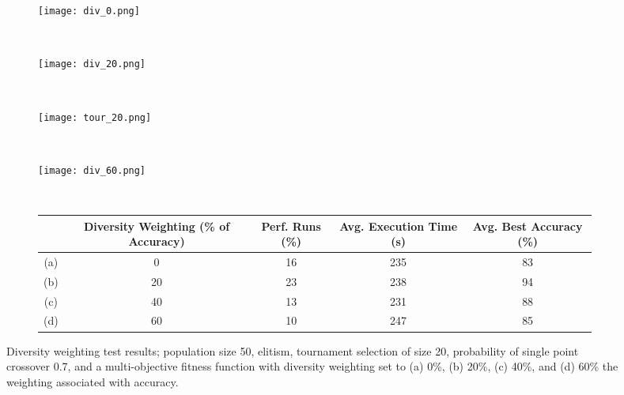 \begin{figure}
	\centering
	\begin{subfigure}[ht]{0.49\textwidth}
		\texttt{[image: div\_0.png]}
		\caption{}
		\label{fig:div_0}
		\vspace{1em}
	\end{subfigure}
	~
	\begin{subfigure}[ht]{0.49\textwidth}
		\texttt{[image: div\_20.png]}
		\caption{}
		\vspace{1em}
		\label{fig:div_2}
	\end{subfigure}
	~
	\begin{subfigure}[ht]{0.49\textwidth}
		\texttt{[image: tour\_20.png]}
		\caption{}
		\vspace{1em}
	\end{subfigure}
	~
	\begin{subfigure}[ht]{0.49\textwidth}
		\texttt{[image: div\_60.png]}
		\caption{}
		\vspace{1em}
		\label{fig:div_6}
	\end{subfigure}
	~
	\begin{subfigure}[ht]{\textwidth}
		\centering
		\begin{tabular}{ccccc}
			\toprule
			& \parbox{0.2\linewidth}{\centering \bfseries{Diversity Weighting (\% of Accuracy)}} &
			\bfseries{Perf. Runs (\%)} &
			\bfseries{Avg. Execution Time (s)} & \bfseries{Avg. Best Accuracy (\%)}\\
			\midrule
			(a) & 0 & 16 & 235 & 83\\
			(b) & 20 & 23 & 238 & 94\\
			(c) & 40 & 13 & 231 & 88\\
			(d) & 60 & 10 & 247 & 85\\
			\bottomrule
		\end{tabular}
	\end{subfigure}

	\caption[Diversity weighting test results]{Diversity weighting test results;
	population size 50, elitism, tournament selection of size 20, probability
	of single point crossover 0.7, and a multi-objective fitness function with
	diversity weighting set to (a) 0\%, (b) 20\%, (c) 40\%, and (d) 60\% the weighting
	associated with accuracy.}
	\label{fig:div}
\end{figure}

